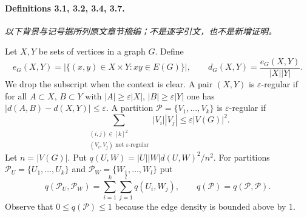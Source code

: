 \paragraph{Definitions 3.1, 3.2, 3.4, 3.7.}
\noindent\textit{以下背景与记号据所列原文章节摘编；不是逐字引文，也不是新增证明。}\par
Let $X,Y$ be sets of vertices in a graph $G$. Define
\[e_G(X,Y)=|\{(x,y)\in X\times Y:xy\in E(G)\}|,\qquad d_G(X,Y)=\frac{e_G(X,Y)}{|X||Y|}.\]
We drop the subscript when the context is clear. A pair $(X,Y)$ is $\varepsilon$-regular if for all $A\subset X$, $B\subset Y$ with $|A|\geq\varepsilon|X|$, $|B|\geq\varepsilon|Y|$ one has $|d(A,B)-d(X,Y)|\leq\varepsilon$. A partition $\mathcal P=\{V_1,\ldots,V_k\}$ is $\varepsilon$-regular if
\[\sum_{\substack{(i,j)\in[k]^2\\(V_i,V_j)\text{ not }\varepsilon\text{-regular}}}|V_i||V_j|\leq\varepsilon|V(G)|^2.\]
Let $n=|V(G)|$. Put $q(U,W)=|U||W|d(U,W)^2/n^2$. For partitions $\mathcal P_U=\{U_1,\ldots,U_k\}$ and $\mathcal P_W=\{W_1,\ldots,W_l\}$ put
\[q(\mathcal P_U,\mathcal P_W)=\sum_{i=1}^k\sum_{j=1}^lq(U_i,W_j),\qquad q(\mathcal P)=q(\mathcal P,\mathcal P).\]
Observe that $0\leq q(\mathcal P)\leq1$ because the edge density is bounded above by $1$.


